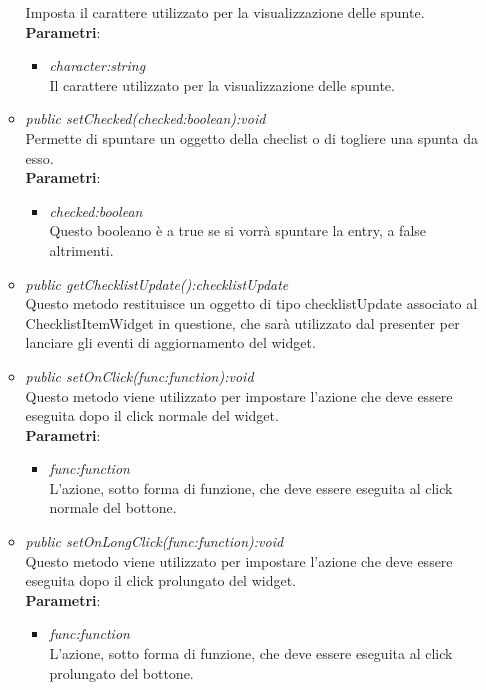 \begin{itemize}
\begin{itemize}
	Imposta il carattere utilizzato per la visualizzazione delle spunte.
		\\ \textbf{Parametri}: \begin{itemize}
		\item \textit{character:string}\\
		Il carattere utilizzato per la visualizzazione delle spunte.
		\end{itemize} 
	\item \textit{public setChecked(checked:boolean):void}\\
	Permette di spuntare un oggetto della checlist o di togliere una spunta da esso.
		\\ \textbf{Parametri}: \begin{itemize}
		\item \textit{checked:boolean}\\
		Questo booleano è a true se si vorrà spuntare la entry, a false altrimenti.
		\end{itemize}  
	\item \textit{public getChecklistUpdate():checklistUpdate}\\
	Questo metodo restituisce un oggetto di tipo checklistUpdate associato al ChecklistItemWidget in questione, che sarà utilizzato dal presenter per lanciare gli eventi di aggiornamento del widget.
	\item \textit{public setOnClick(func:function):void}\\
	Questo metodo viene utilizzato per impostare l'azione che deve essere eseguita dopo il click normale del widget.
		\\ \textbf{Parametri}: \begin{itemize}
		\item \textit{func:function}\\
		L'azione, sotto forma di funzione, che deve essere eseguita al click normale del bottone.
		\end{itemize}
	\item \textit{public setOnLongClick(func:function):void}\\
		Questo metodo viene utilizzato per impostare l'azione che deve essere eseguita dopo il click prolungato del widget.
		\\ \textbf{Parametri}: \begin{itemize}
		\item \textit{func:function}\\
		L'azione, sotto forma di funzione, che deve essere eseguita al click prolungato del bottone.
		\end{itemize}

\end{itemize}
\end{itemize}
